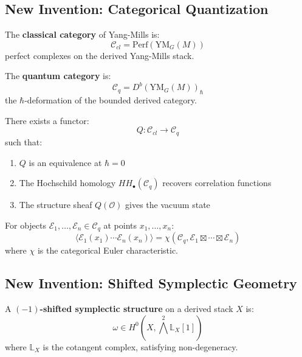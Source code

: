 \subsection{New Invention: Categorical Quantization}

\begin{definition}
The \textbf{classical category} of Yang-Mills is:
\[
\mathcal{C}_{cl} = \text{Perf}(\text{YM}_G(M))
\]
perfect complexes on the derived Yang-Mills stack.
\end{definition}

\begin{definition}
The \textbf{quantum category} is:
\[
\mathcal{C}_q = D^b(\text{YM}_G(M))_{\hbar}
\]
the $\hbar$-deformation of the bounded derived category.
\end{definition}

\begin{theorem}
There exists a functor:
\[
Q: \mathcal{C}_{cl} \to \mathcal{C}_q
\]
such that:
\begin{enumerate}
    \item $Q$ is an equivalence at $\hbar = 0$
    \item The Hochschild homology $HH_\bullet(\mathcal{C}_q)$ recovers correlation functions
    \item The structure sheaf $Q(\mathcal{O})$ gives the vacuum state
\end{enumerate}
\end{theorem}

\begin{definition}
For objects $\mathcal{E}_1, \ldots, \mathcal{E}_n \in \mathcal{C}_q$ at points $x_1, \ldots, x_n$:
\[
\langle \mathcal{E}_1(x_1) \cdots \mathcal{E}_n(x_n) \rangle = \chi(\mathcal{C}_q, \mathcal{E}_1 \boxtimes \cdots \boxtimes \mathcal{E}_n)
\]
where $\chi$ is the categorical Euler characteristic.
\end{definition}

\subsection{New Invention: Shifted Symplectic Geometry}

\begin{definition}
A \textbf{$(-1)$-shifted symplectic structure} on a derived stack $X$ is:
\[
\omega \in H^0(X, \bigwedge^2 \mathbb{L}_X[1])
\]
where $\mathbb{L}_X$ is the cotangent complex, satisfying non-degeneracy.
\end{definition}

